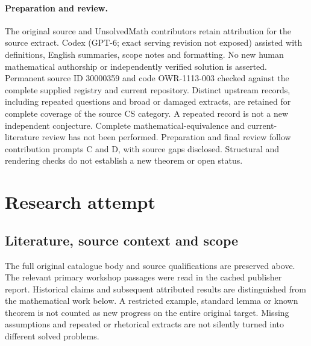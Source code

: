 \documentclass[11pt]{article}
\begin{document}
\paragraph{Preparation and review.}
The original source and UnsolvedMath contributors retain attribution for the source extract. Codex (GPT-6; exact serving revision not exposed) assisted with definitions, English summaries, scope notes and formatting. No new human mathematical authorship or independently verified solution is asserted. Permanent source ID 30000359 and code OWR-1113-003 checked against the complete supplied registry and current repository. Distinct upstream records, including repeated questions and broad or damaged extracts, are retained for complete coverage of the source CS category. A repeated record is not a new independent conjecture. Complete mathematical-equivalence and current-literature review has not been performed. Preparation and final review follow contribution prompts C and D, with source gaps disclosed. Structural and rendering checks do not establish a new theorem or open status.
\label{end:30000359}

\section{Research attempt}
\subsection{Literature, source context and scope}
The full original catalogue body and source qualifications are preserved above. The relevant primary workshop passages were read in the cached publisher report. Historical claims and subsequent attributed results are distinguished from the mathematical work below. A restricted example, standard lemma or known theorem is not counted as new progress on the entire original target. Missing assumptions and repeated or rhetorical extracts are not silently turned into different solved problems.
\end{document}
